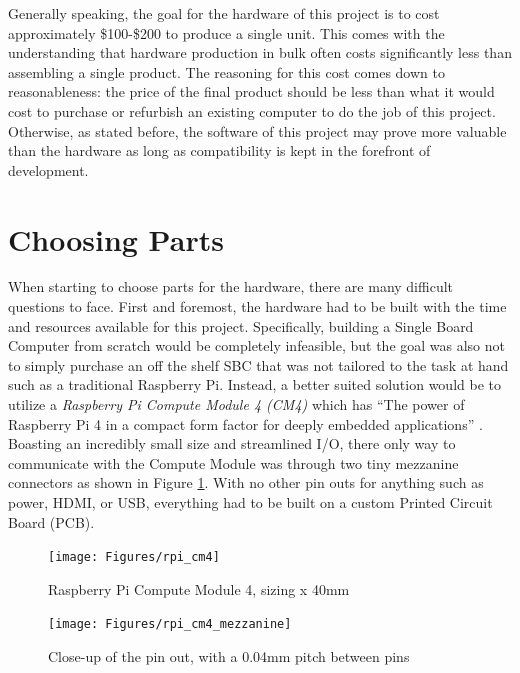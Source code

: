 Generally speaking, the goal for the hardware of this project is to cost approximately \$100-\$200 to produce a single unit.
This comes with the understanding that hardware production in bulk often costs significantly less than assembling a single product.
The reasoning for this cost comes down to reasonableness: the price of the final product should be less than what it would cost to purchase or refurbish an existing computer to do the job of this project.
Otherwise, as stated before, the software of this project may prove more valuable than the hardware as long as compatibility is kept in the forefront of development.


\section{Choosing Parts}\label{sec:ChoosingParts}

When starting to choose parts for the hardware, there are many difficult questions to face.
First and foremost, the hardware had to be built with the time and resources available for this project.
Specifically, building a Single Board Computer from scratch would be completely infeasible, but the goal was also not to simply purchase an off the shelf SBC that was not tailored to the task at hand such as a traditional Raspberry Pi.
Instead, a better suited solution would be to utilize a \emph{Raspberry Pi Compute Module 4 (CM4)} which has \enquote{The power of Raspberry Pi 4 in a compact form factor for deeply embedded applications} \cite{rpi_cm4}.
Boasting an incredibly small size and streamlined I/O, there only way to communicate with the Compute Module was through two tiny mezzanine connectors as shown in Figure \ref{fig:rpi_cm4_mezzanine}.
With no other pin outs for anything such as power, HDMI, or USB, everything had to be built on a custom Printed Circuit Board (PCB).

\begin{figure}[h]
  \centering
  \begin{minipage}{0.45\textwidth}
    \centering
    \texttt{[image: Figures/rpi\_cm4]}
    \captionsetup{width=.75\linewidth}
    \caption[Raspberry Pi Compute Module 4]{Raspberry Pi Compute Module 4, sizing x 40mm}
    \label{fig:rpi_cm4}
  \end{minipage}\hfill
  \begin{minipage}{0.45\textwidth}
    \centering
    \texttt{[image: Figures/rpi\_cm4\_mezzanine]}
    \captionsetup{width=.75\linewidth}
    \caption[Raspberry Pi Compute Module 4 Pin out]{Close-up of the pin out, with a 0.04mm pitch between pins}
    \label{fig:rpi_cm4_mezzanine}
  \end{minipage}
\end{figure}

